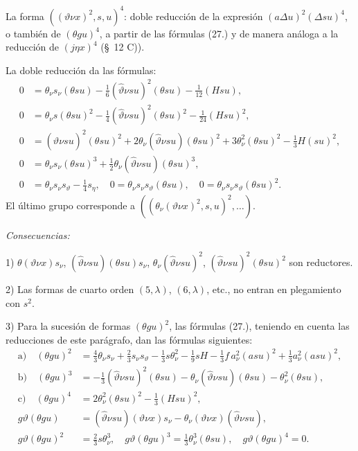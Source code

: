 \documentclass[11pt]{article}
\newcommand{\A}{\Delta}
\begin{document}
La forma $((\vartheta\nu x)^2,s,u)^4$: doble reducción de la expresión $(a\A u)^2(\A su)^4$, o también de $(\theta gu)^4$, a partir de las fórmulas (27.) y de manera análoga a la reducción de $(j\eta x)^4$ (\S\ 12 C)).

La doble reducción da las fórmulas:
\[
\tag{28}
\begin{aligned}
0&=\theta_\nu s_\nu(\theta su)-\frac16(\widehat\vartheta\nu su)^2(\theta su)-\frac1{12}(Hsu),\\
0&=\theta_\nu s(\theta su)^2-\frac14(\widehat\vartheta\nu su)^2(\theta su)^2-\frac1{24}(Hsu)^2,\\
0&=(\widehat\vartheta\nu su)^2(\theta su)^2+2\theta_\nu(\widehat\vartheta\nu su)(\theta su)^2
  +3\theta_\nu^2(\theta su)^2-\frac13H(su)^2,\\
0&=\theta_\nu s_\nu(\theta su)^3+\frac12\theta_\nu(\widehat\vartheta\nu su)(\theta su)^3,\\
0&=\theta_\nu s_\nu s_\vartheta-\frac14s_\eta,
\quad 0=\theta_\nu s_\nu s_\vartheta(\theta su),
\quad 0=\theta_\nu s_\nu s_\vartheta(\theta su)^2.
\end{aligned}
\]
El último grupo corresponde a $((\theta_\nu(\vartheta\nu x)^2,s,u)^2,\ldots)$.

\noindent\emph{Consecuencias:}

1) $\theta(\vartheta\nu x)s_\nu$, $(\widehat\vartheta\nu su)(\theta su)s_\nu$, $\theta_\nu(\widehat\vartheta\nu su)^2$, $(\widehat\vartheta\nu su)^2(\theta su)^2$ son reductores.

2) Las formas de cuarto orden $(5,\lambda)$, $(6,\lambda)$, etc., no entran en plegamiento con $s^2$.

3) Para la sucesión de formas $(\theta gu)^2$, las fórmulas (27.), teniendo en cuenta las reducciones de este parágrafo, dan las fórmulas siguientes:
\[
\tag{29}
\begin{aligned}
\text{a)}\quad (\theta gu)^2&=\frac43\theta_\nu s_\nu+\frac23s_\nu s_\vartheta-\frac13s\theta_\nu^2-\frac19sH-\frac13f\,a_\nu^2(asu)^2+\frac13a_\nu^2(asu)^2,\\
\text{b)}\quad (\theta gu)^3&=-\frac13(\widehat\vartheta\nu su)^2(\theta su)-\theta_\nu(\widehat\vartheta\nu su)(\theta su)-\theta_\nu^2(\theta su),\\
\text{c)}\quad (\theta gu)^4&=2\theta_\nu^2(\theta su)^2-\frac13(Hsu)^2,\\
g\vartheta(\theta gu)&=(\widehat\vartheta\nu su)(\vartheta\nu x)s_\nu-\theta_\nu(\vartheta\nu x)(\widehat\vartheta\nu su),\\
g\vartheta(\theta gu)^2&=\frac23s\theta_\nu^3,
\quad g\vartheta(\theta gu)^3=\frac13\theta_\nu^3(\theta su),
\quad g\vartheta(\theta gu)^4=0.
\end{aligned}
\]
\end{document}
